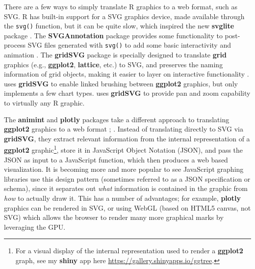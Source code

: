 \documentclass[11pt]{isuthesis}
\begin{document}
There are a few ways to simply translate R graphics to a web format,
such as SVG. R has built-in support for a SVG graphics device, made
available through the \texttt{svg()} function, but it can be quite slow,
which inspired the new \textbf{svglite} package \citep{svglite}. The
\textbf{SVGAnnotation} package provides some functionality to
post-process SVG files generated with \texttt{svg()} to add some basic
interactivity and animation \citep{SVGAnnotation}. The \textbf{gridSVG}
package is specially designed to translate \textbf{grid} graphics (e.g.,
\textbf{ggplot2}, \textbf{lattice}, etc.) to SVG, and preserves the
naming information of grid objects, making it easier to layer on
interactive functionality \citep{gridSVGreport}. \citet{vdmR} uses
\textbf{gridSVG} to enable linked brushing between \textbf{ggplot2}
graphics, but only implements a few chart types. \citet{svgPanZoom} uses
\textbf{gridSVG} to provide pan and zoom capability to virtually any R
graphic.

The \textbf{animint} and \textbf{plotly} packages take a different
approach to translating \textbf{ggplot2} graphics to a web format
\citep{animint}; \citep{plotly}. Instead of translating directly to SVG
via \textbf{gridSVG}, they extract relevant information from the
internal representation of a \textbf{ggplot2} graphic\footnote{For a
  visual display of the internal representation used to render a
  \textbf{ggplot2} graph, see my \textbf{shiny} app here
  \url{https://gallery.shinyapps.io/ggtree}.}, store it in JavaScript
Object Notation (JSON), and pass the JSON as input to a JavaScript
function, which then produces a web based visualization. It is becoming
more and more popular to see JavaScript graphing libraries use this
design pattern (sometimes referred to as a JSON specification or
schema), since it separates out \emph{what} information is contained in
the graphic from \emph{how} to actually draw it. This has a number of
advantages; for example, \textbf{plotly} graphics can be rendered in
SVG, or using WebGL (based on HTML5 canvas, not SVG) which allows the
browser to render many more graphical marks by leveraging the GPU.
\end{document}
